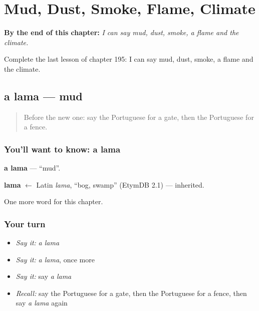 
\chapter{Mud, Dust, Smoke, Flame, Climate}
\label{ch:pt-mud-dust-smoke-flame-climate}

\begin{chapteropening}
\textbf{By the end of this chapter:} \emph{I can say mud, dust, smoke, a flame and the climate.}

Complete the last lesson of chapter 195: I can say mud, dust, smoke, a flame and the climate.
\end{chapteropening}

\section[a lama]{a lama — mud}

\label{lesson:PT-C195-lama}



\begin{quote}
Before the new one: say the Portuguese for a gate, then the Portuguese for a fence.
\end{quote}

\subsection*{You'll want to know: a lama}
\textbf{a lama} — \textquotedblleft{}mud\textquotedblright{}.

\begin{cousinweb}
\textbf{lama} $\leftarrow$ Latin \emph{lama}, \textquotedblleft{}bog, swamp\textquotedblright{} (EtymDB 2.1) — inherited.
\end{cousinweb}

\begin{grammarlens}[title={What you've built}]
One more word for this chapter.
\end{grammarlens}

\subsection*{Your turn}
\begin{itemize}
\raggedright
  \item \emph{Say it:} \emph{a lama}
  \item \emph{Say it:} \emph{a lama}, once more
  \item \emph{Say it:} say \emph{a lama}
  \item \emph{Recall:} say the Portuguese for a gate, then the Portuguese for a fence, then say \emph{a lama} again
\end{itemize}

